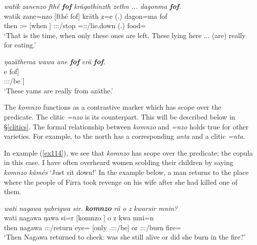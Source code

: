 \begin{exe}
	\ex \emph{watik zanenzo fthé \textbf{fof} krägathinzth zethn ... dagonma \textbf{fof}.}\\
	\gll watik zane=nzo [fthé fof] kräth z=e (.) dagon=ma fof\\
	then \Dem{}:\Prox{}=\Only{} [when \Emph{}] \Stpl:\Sbj:\Irr:\Pfv/stop \Prox=\Stpl\Sbj:\Nonpast:\Stat/lie.down (.) food=\Char{} \Emph{}\\
	\trans `That is the time, when only these ones are left. These lying here ... (are) really for eating.' 
	\label{ex112}
\end{exe}
\begin{exe}
	\ex \emph{ŋazäthema wawa ane \textbf{fof} erä \textbf{fof}.}\\
	\gll [ŋazäthe=ma [wawa ane fof] e fof]\\
	[ŋazäthe=\Char{} [yam \Dem{} \Emph{}] \Stpl:\Sbj:\Nonpast:\Ipfv/be \Emph{}]\\
	\trans `These yams are really from \NG{}azäthe.' 
	\label{ex113}
\end{exe}

The  \emph{komnzo} functions as a contrastive  marker which has scope over the predicate. The clitic \emph{=nzo} is its  counterpart. This will be described below in \S{}\ref{clitics}. The formal relationship between \emph{komnzo} and \emph{=nzo} holds true for other  varieties. For example,  to the north has a corresponding  \emph{anta} and a clitic \emph{=nta}.%

In example (\ref{ex114}), we see that \emph{komnzo} has scope over the predicate; the copula in this case. I have often overheard women scolding their children by saying \emph{komnzo kämés} `Just sit down!' In the example below, a man returns to the place where the people of Firra took revenge on his wife after she had killed one of them.

\begin{exe}
	\ex	\emph{wati nagawa ŋabrigwa sir. \textbf{komnzo} rä o z kwarsir mnin?}\\
	\gll wati nagawa ŋawa si=r [komnzo ] o z kwa mni=n\\
	then nagawa \Stsg:\Sbj:\Pst:\Ipfv/return eye=\Purp{} [only \Tsg.\F:\Sbj:\Nonpast:\Ipfv/be] or \Iam{} \Stsg:\Sbj:\Rpst:\Ipfv/burn fire=\Loc{}\\
	\trans `Then Nagawa returned to check: was she still alive or did she burn in the fire?' 
	\label{ex114}
\end{exe}

